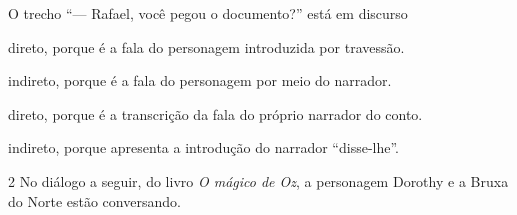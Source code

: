 \begin{conteudo}
\begin{conteudo}
\begin{conteudo}
\begin{conteudo}
\begin{conteudo}

O trecho ``--- Rafael, você pegou o documento?'' está em discurso

\begin{escolha}
\item direto, porque é a fala do personagem introduzida por travessão.

\item indireto, porque é a fala do personagem por meio do narrador.

\item direto, porque é a transcrição da fala do próprio narrador do conto.

\item indireto, porque apresenta a introdução do narrador ``disse-lhe''.
\end{escolha}

\num{2} No diálogo a seguir, do livro \textit{O mágico de Oz}, a personagem
Dorothy e a Bruxa do Norte estão conversando.

\end{conteudo}
\end{conteudo}
\end{conteudo}
\end{conteudo}
\end{conteudo}
